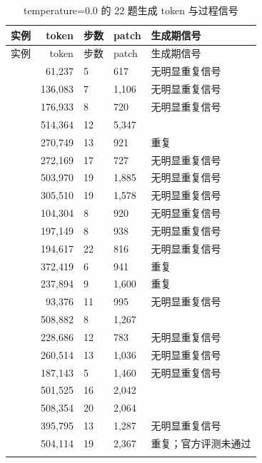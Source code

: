 \documentclass[UTF8,a4paper,11pt]{ctexart}
\begin{document}
\begin{center}
{\scriptsize
\begin{longtable}{L{4.0cm} r C{1.4cm} C{1.5cm} L{5.0cm}}
\toprule
实例 & token & 步数 & patch & 生成期信号 \\
\midrule
\endfirsthead
\toprule
实例 & token & 步数 & patch & 生成期信号 \\
\midrule
\endhead
{} & 61,237 & 5 & 617 & 无明显重复信号 \\
 & 136,083 & 7 & 1,106 & 无明显重复信号 \\
 & 176,933 & 8 & 720 & 无明显重复信号 \\
 & 514,364 & 12 & 5,347 &  \\
 & 270,749 & 13 & 921 &  重复 \\
 & 272,169 & 17 & 727 & 无明显重复信号 \\
 & 503,970 & 19 & 1,885 & 无明显重复信号 \\
 & 305,510 & 19 & 1,578 & 无明显重复信号 \\
 & 104,304 & 8 & 920 & 无明显重复信号 \\
 & 197,149 & 8 & 938 & 无明显重复信号 \\
 & 194,617 & 22 & 816 & 无明显重复信号 \\
 & 372,419 & 6 & 941 &  重复 \\
 & 237,894 & 9 & 1,600 &  重复 \\
 & 93,376 & 11 & 995 & 无明显重复信号 \\
 & 508,882 & 8 & 1,267 &  \\
 & 228,686 & 12 & 783 & 无明显重复信号 \\
 & 260,514 & 13 & 1,036 & 无明显重复信号 \\
 & 187,143 & 5 & 1,460 & 无明显重复信号 \\
 & 501,525 & 16 & 2,042 &  \\
 & 508,354 & 20 & 2,064 &  \\
 & 395,795 & 13 & 1,287 & 无明显重复信号 \\
 & 504,114 & 19 & 2,367 &  重复；官方评测未通过 \\
\bottomrule
\caption{temperature=0.0 的 22 题生成 token 与过程信号}
\end{longtable}
}
\end{center}
\end{document}
